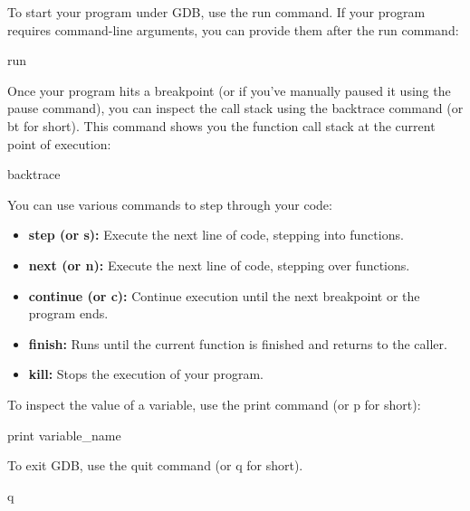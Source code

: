 \documentclass{report}
\begin{document}
     \bigbreak \noindent 
     \bigbreak \noindent 
     To start your program under GDB, use the run command. If your program requires command-line arguments, you can provide them after the run command:
     \bigbreak \noindent 
     \begin{bashcode}
     run
     \end{bashcode}
     \bigbreak \noindent 
     \bigbreak \noindent 
     Once your program hits a breakpoint (or if you've manually paused it using the pause command), you can inspect the call stack using the backtrace command (or bt for short). This command shows you the function call stack at the current point of execution:
     \bigbreak \noindent 
     \begin{bashcode}
     backtrace
     \end{bashcode}
     \bigbreak \noindent 
     \bigbreak \noindent 
     You can use various commands to step through your code:
     \begin{itemize}
         \item \textbf{step (or s):} Execute the next line of code, stepping into functions.
         \item \textbf{next (or n):} Execute the next line of code, stepping over functions.
         \item \textbf{continue (or c):} Continue execution until the next breakpoint or the program ends.
         \item \textbf{finish:} Runs until the current function is finished and returns to the caller.
         \item \textbf{kill:} Stops the execution of your program.
     \end{itemize}
     \bigbreak \noindent 
     \bigbreak \noindent 
     To inspect the value of a variable, use the print command (or p for short):
     \bigbreak \noindent 
     \begin{bashcode}
     print variable_name
     \end{bashcode}
     \bigbreak \noindent 
     \bigbreak \noindent 
     To exit GDB, use the quit command (or q for short).
     \bigbreak \noindent 
     \begin{bashcode}
     q
     \end{bashcode}

     \bigbreak \noindent 
     \bigbreak \noindent 
\end{document}
